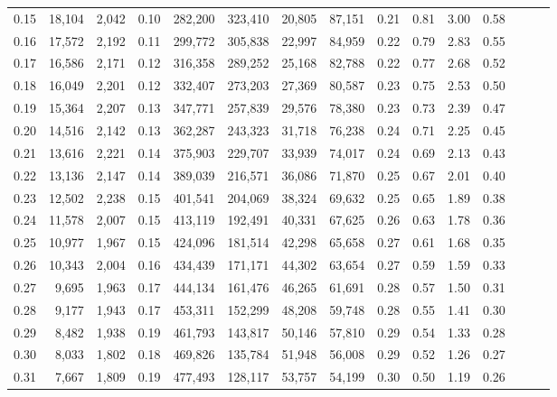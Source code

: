 \begin{tabular}{rrrrrrrrrrrrrrr}
0.15 &  18,104 &  2,042 &  0.10 &  282,200 &  323,410 &   20,805 &   87,151 &  0.21 &  0.81 &  3.00 &      0.58 \\
0.16 &  17,572 &  2,192 &  0.11 &  299,772 &  305,838 &   22,997 &   84,959 &  0.22 &  0.79 &  2.83 &      0.55 \\
0.17 &  16,586 &  2,171 &  0.12 &  316,358 &  289,252 &   25,168 &   82,788 &  0.22 &  0.77 &  2.68 &      0.52 \\
0.18 &  16,049 &  2,201 &  0.12 &  332,407 &  273,203 &   27,369 &   80,587 &  0.23 &  0.75 &  2.53 &      0.50 \\
0.19 &  15,364 &  2,207 &  0.13 &  347,771 &  257,839 &   29,576 &   78,380 &  0.23 &  0.73 &  2.39 &      0.47 \\
0.20 &  14,516 &  2,142 &  0.13 &  362,287 &  243,323 &   31,718 &   76,238 &  0.24 &  0.71 &  2.25 &      0.45 \\
0.21 &  13,616 &  2,221 &  0.14 &  375,903 &  229,707 &   33,939 &   74,017 &  0.24 &  0.69 &  2.13 &      0.43 \\
0.22 &  13,136 &  2,147 &  0.14 &  389,039 &  216,571 &   36,086 &   71,870 &  0.25 &  0.67 &  2.01 &      0.40 \\
0.23 &  12,502 &  2,238 &  0.15 &  401,541 &  204,069 &   38,324 &   69,632 &  0.25 &  0.65 &  1.89 &      0.38 \\
0.24 &  11,578 &  2,007 &  0.15 &  413,119 &  192,491 &   40,331 &   67,625 &  0.26 &  0.63 &  1.78 &      0.36 \\
0.25 &  10,977 &  1,967 &  0.15 &  424,096 &  181,514 &   42,298 &   65,658 &  0.27 &  0.61 &  1.68 &      0.35 \\
0.26 &  10,343 &  2,004 &  0.16 &  434,439 &  171,171 &   44,302 &   63,654 &  0.27 &  0.59 &  1.59 &      0.33 \\
0.27 &   9,695 &  1,963 &  0.17 &  444,134 &  161,476 &   46,265 &   61,691 &  0.28 &  0.57 &  1.50 &      0.31 \\
0.28 &   9,177 &  1,943 &  0.17 &  453,311 &  152,299 &   48,208 &   59,748 &  0.28 &  0.55 &  1.41 &      0.30 \\
0.29 &   8,482 &  1,938 &  0.19 &  461,793 &  143,817 &   50,146 &   57,810 &  0.29 &  0.54 &  1.33 &      0.28 \\
0.30 &   8,033 &  1,802 &  0.18 &  469,826 &  135,784 &   51,948 &   56,008 &  0.29 &  0.52 &  1.26 &      0.27 \\
0.31 &   7,667 &  1,809 &  0.19 &  477,493 &  128,117 &   53,757 &   54,199 &  0.30 &  0.50 &  1.19 &      0.26 \\

\end{tabular}
